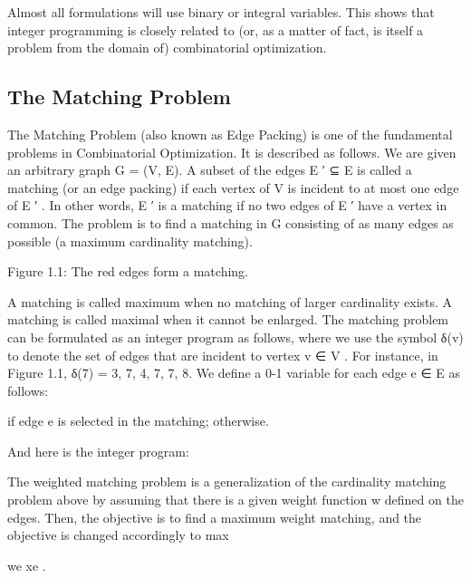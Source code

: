 \documentclass[titlepage]{book}
\begin{document}
Almost all formulations will use binary or integral variables. This shows that integer programming
is closely related to (or, as a matter of fact, is itself a problem from the domain of) combinatorial
optimization.

\subsection{The Matching Problem}

The Matching Problem (also known as Edge Packing) is one of the fundamental problems in Combinatorial
Optimization. It is described as follows. We are given an arbitrary graph G = (V, E). A subset of the
edges E ′ ⊆ E is called a matching (or an edge packing) if each vertex of V is incident to at most one edge
of E ′ . In other words, E ′ is a matching if no two edges of E ′ have a vertex in common. The problem is
to find a matching in G consisting of as many edges as possible (a maximum cardinality matching).

Figure 1.1: The red edges form a matching.

A matching is called maximum when no matching of larger cardinality exists. A matching is called
maximal when it cannot be enlarged.
The matching problem can be formulated as an integer program as follows, where we use the symbol
δ(v) to denote the set of edges that are incident to vertex v ∈ V . For instance, in Figure 1.1, δ(7) =
{{3, 7}, {4, 7}, {7, 8}}. We define a 0-1 variable for each edge e ∈ E as follows:


if edge e is selected in the matching;
otherwise.

And here is the integer program:


The weighted matching problem is a generalization of the cardinality matching problem above by assuming that there is a given weight function w defined on the edges. Then, the objective is to find a
maximum weight matching, and the objective is changed accordingly to max


we xe . 
\end{document}
